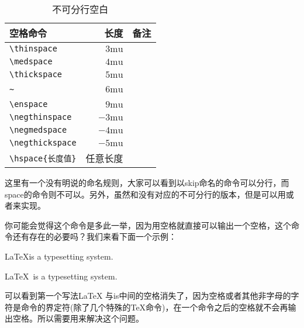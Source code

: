 \begin{table}[htpb]
	\centering
	\begin{tabular}{lrl} \toprule
		空格命令               & 长度          & 备注                                 \\ \midrule
		\verb|\thinspace|      & $3\text{mu}$  & \Rightarrow\thinspace \Leftarrow     \\
		\verb|\medspace|       & $4\text{mu}$  & \Rightarrow\medspace \Leftarrow      \\
		\verb|\thickspace|     & $5\text{mu}$  & \Rightarrow\thickspace \Leftarrow    \\
		\verb|~|               & $6\text{mu}$  & \Rightarrow~\Leftarrow               \\
		\verb|\enspace|        & $9\text{mu}$  & \Rightarrow\enspace \Leftarrow       \\
		\verb|\negthinspace|   & $-3\text{mu}$ & \Rightarrow\negthinspace \Leftarrow  \\
		\verb|\negmedspace|    & $-4\text{mu}$ & \Rightarrow\negmedspace \Leftarrow   \\
		\verb|\negthickspace|  & $-5\text{mu}$ & \Rightarrow\negthickspace \Leftarrow \\
		\verb|\hspace{长度值}| & 任意长度      &                                      \\ \bottomrule
	\end{tabular}
	\caption{不可分行空白}
\end{table}

这里有一个没有明说的命名规则，大家可以看到以skip命名的命令可以分行，而space的命令则不可以。另外，虽然\texinline{\quad}和\texinline{\qquad}没有对应的不可分行的版本，但是可以用\texinline{\hspace{1em}}或者\texinline{\hspace{2em}}来实现。

你可能会觉得\texinline[showspaces]{\ }这个命令是多此一举，因为用空格就直接可以输出一个空格，这个命令还有存在的必要吗？我们来看下面一个示例：
\begin{texlst}
	\LaTeX is a typesetting system.

	\LaTeX\ is a typesetting system.	
\end{texlst}

可以看到第一个写法\LaTeX
与is中间的空格消失了，因为空格或者其他非字母的字符是命令的界定符(除了几个特殊的\TeX 命令)，在一个命令之后的空格就不会再输出空格。所以需要用\texinline[showspaces]{\ }来解决这个问题。

